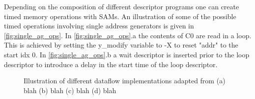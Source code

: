 Depending on the composition of different descriptor programs one can create
timed memory operations with SAMs. An illustration of some of the possible timed
operations involving single address generators is given in
\autoref{fig:single_ag_ops}. In \autoref{fig:single_ag_ops}.a the contents of C0
are read in a loop. This is achieved by setting the y\_modify variable to -X to
reset "addr" to the start idx 0. In \autoref{fig:single_ag_ops}.b a wait
descriptor is inserted prior to the loop descriptor to introduce a delay in the
start time of the loop descriptor.

\begin{figure}
    \centering
    \hspace{0.2cm}
    \caption{Illustration of different dataflow implementations adapted from \cite{dnn_df_overrated} (a) blah (b) blah (c) blah (d) blah}
    \label{fig:single_ag_ops}
\end{figure}

